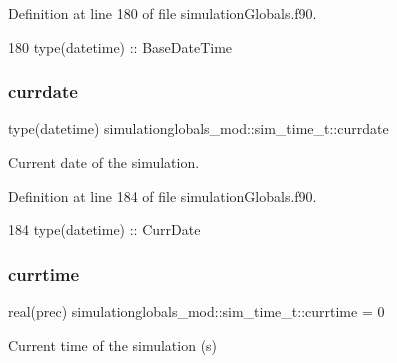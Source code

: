 Definition at line 180 of file simulation\+Globals.\+f90.


\begin{DoxyCode}
180         \textcolor{keywordtype}{type}(datetime)  :: BaseDateTime
\end{DoxyCode}
\mbox{\label{structsimulationglobals__mod_1_1sim__time__t_a547910a1c56076286ad768d6862725a5}} 
\subsubsection{\texorpdfstring{currdate}{currdate}}
{\footnotesize\ttfamily type(datetime) simulationglobals\+\_\+mod\+::sim\+\_\+time\+\_\+t\+::currdate\hspace{0.3cm}{\ttfamily [private]}}



Current date of the simulation. 



Definition at line 184 of file simulation\+Globals.\+f90.


\begin{DoxyCode}
184         \textcolor{keywordtype}{type}(datetime)  :: CurrDate
\end{DoxyCode}
\mbox{\label{structsimulationglobals__mod_1_1sim__time__t_aef4f2cbfeae48936accb80bcc819b778}} 
\subsubsection{\texorpdfstring{currtime}{currtime}}
{\footnotesize\ttfamily real(prec) simulationglobals\+\_\+mod\+::sim\+\_\+time\+\_\+t\+::currtime = 0\hspace{0.3cm}{\ttfamily [private]}}



Current time of the simulation (s) 



